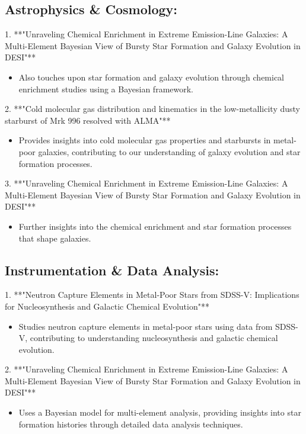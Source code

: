 \documentclass[11pt]{article}
\begin{document}
\subsection*{Astrophysics \& Cosmology:}
1. **"Unraveling Chemical Enrichment in Extreme Emission-Line Galaxies: A Multi-Element Bayesian View of Bursty Star Formation and Galaxy Evolution in DESI"**
\begin{itemize}
\item Also touches upon star formation and galaxy evolution through chemical enrichment studies using a Bayesian framework.
\end{itemize}
2. **"Cold molecular gas distribution and kinematics in the low-metallicity dusty starburst of Mrk 996 resolved with ALMA"**
\begin{itemize}
\item Provides insights into cold molecular gas properties and starbursts in metal-poor galaxies, contributing to our understanding of galaxy evolution and star formation processes.
\end{itemize}
3. **"Unraveling Chemical Enrichment in Extreme Emission-Line Galaxies: A Multi-Element Bayesian View of Bursty Star Formation and Galaxy Evolution in DESI"**
\begin{itemize}
\item Further insights into the chemical enrichment and star formation processes that shape galaxies.
\end{itemize}
\subsection*{Instrumentation \& Data Analysis:}
1. **"Neutron Capture Elements in Metal-Poor Stars from SDSS-V: Implications for Nucleosynthesis and Galactic Chemical Evolution"**
\begin{itemize}
\item Studies neutron capture elements in metal-poor stars using data from SDSS-V, contributing to understanding nucleosynthesis and galactic chemical evolution.
\end{itemize}
2. **"Unraveling Chemical Enrichment in Extreme Emission-Line Galaxies: A Multi-Element Bayesian View of Bursty Star Formation and Galaxy Evolution in DESI"**
\begin{itemize}
\item Uses a Bayesian model for multi-element analysis, providing insights into star formation histories through detailed data analysis techniques.
\end{itemize}
\end{document}
